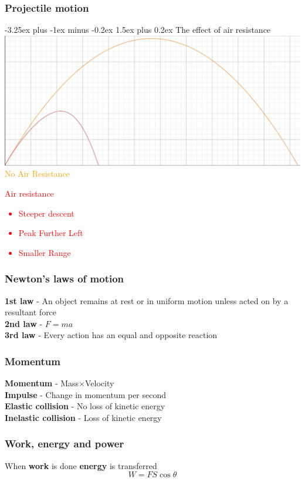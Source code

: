 \documentclass[12pt]{article}
\makeatletter
\renewcommand{\paragraph}{\@startsection{paragraph}{4}{0ex}%
    {-3.25ex plus -1ex minus -0.2ex}%
    {1.5ex plus 0.2ex}%
    {\normalfont\normalsize\bfseries}}
\makeatother
\begin{document}
\subsubsection{Projectile motion}
\paragraph{The effect of air resistance}
\includegraphics[scale=0.25]{Air_Resistance.JPG}\\
\textcolor{orange}{No Air Resistance}\\
\textcolor{red}{Air resistance
\begin{itemize}
\item Steeper descent
\item Peak Further Left
\item Smaller Range
\end{itemize}}
\subsubsection{Newton's laws of motion}
\textbf{1st law} - An object remains at rest or in uniform motion unless acted on by a resultant force\\
\textbf{2nd law} - $F=ma$\\
\textbf{3rd law} - Every action has an equal and opposite reaction
\subsubsection{Momentum}
\textbf{Momentum} - Mass$\times$Velocity\\
\textbf{Impulse} - Change in momentum per second\\
\textbf{Elastic collision} - No loss of kinetic energy\\
\textbf{Inelastic collision} - Loss of kinetic energy
\subsubsection{Work, energy and power}
When \textbf{work} is done \textbf{energy} is transferred
$$W=FS\cos\theta$$
\end{document}

